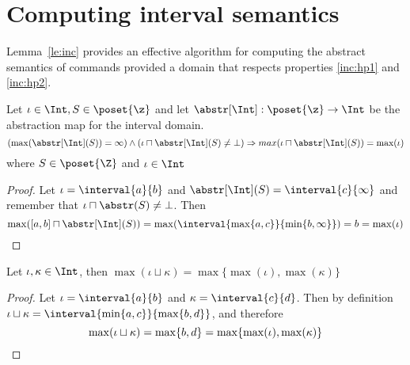 \section{Computing interval semantics}
\label{sec:computingint}

Lemma~\ref{le:inc} provides an effective algorithm for computing the
abstract semantics of commands provided a domain that respects
properties \ref{inc:hp1} and \ref{inc:hp2}. %

\begin{observation}
  Let \(\iota \in \Int, S \in \poset{\z}\) and let
  \({\abstr[\Int] : \poset{\z} \to \Int}\) be the abstraction map for
  the interval domain. 
  \begin{equation*}
    \left(\max(\abstr[\Int](S)) = \infty\right) \land \left(\iota \sqcap \abstr[\Int](S) \neq \bot\right)
    \Rightarrow max(\iota \sqcap \abstr[\Int](S)) = \max(\iota)
  \end{equation*}
  where \(S \in \poset{\Z}\) and \(\iota \in \Int\)
\end{observation}

\begin{proof}
  Let \(\iota = \interval{a}{b}\) and
  \(\abstr[\Int](S) = \interval{c}{\infty}\) and remember that
  \({\iota \sqcap \abstr(S) \neq \bot}\). Then
  \begin{equation*}
    \max([a,b] \sqcap \abstr[\Int](S)) = \max(\interval{\max\{a, c\}}{\min\{b , \infty\}}) = b = \max(\iota) \qedhere
  \end{equation*}
\end{proof}

\begin{observation}
  Let \(\iota, \kappa \in \Int\), then
  \(\max(\iota \sqcup \kappa) = \max\{\max(\iota), \max(\kappa)\}\)
\end{observation}

\begin{proof}
  Let \(\iota = \interval{a}{b}\) and \(\kappa =
  \interval{c}{d}\). Then by definition
  \(\iota \sqcup \kappa = \interval{\min\{a,c\}}{\max\{b,d\}}\), and
  therefore
  \begin{equation*}
    \max(\iota \sqcup \kappa) = \max\{b,d\} = \max\{\max(\iota), \max(\kappa)\} \qedhere
  \end{equation*}
\end{proof}

